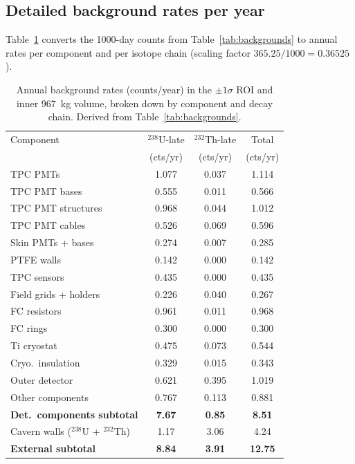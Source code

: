 \documentclass[11pt]{article}
\begin{document}
\subsection{Detailed background rates per year}

Table~\ref{tab:rates} converts the 1000-day counts from
Table~\ref{tab:backgrounds} to annual rates per component and per
isotope chain (scaling factor $365.25/1000 = 0.36525$).

\begin{table}[h]
\centering
\caption{Annual background rates (counts/year) in the $\pm 1\sigma$
  ROI and inner 967~kg volume, broken down by component and decay
  chain.  Derived from Table~\ref{tab:backgrounds}.}
\label{tab:rates}
\begin{tabular}{@{}lS[table-format=1.3]S[table-format=1.3]S[table-format=1.3]@{}}
\toprule
{Component} & {$^{238}$U-late} & {$^{232}$Th-late} & {Total} \\
 & {(cts/yr)} & {(cts/yr)} & {(cts/yr)} \\
\midrule
TPC PMTs             & 1.077 & 0.037 & 1.114 \\
TPC PMT bases        & 0.555 & 0.011 & 0.566 \\
TPC PMT structures   & 0.968 & 0.044 & 1.012 \\
TPC PMT cables       & 0.526 & 0.069 & 0.596 \\
Skin PMTs + bases    & 0.274 & 0.007 & 0.285 \\
PTFE walls           & 0.142 & 0.000 & 0.142 \\
TPC sensors          & 0.435 & 0.000 & 0.435 \\
Field grids + holders& 0.226 & 0.040 & 0.267 \\
FC resistors         & 0.961 & 0.011 & 0.968 \\
FC rings             & 0.300 & 0.000 & 0.300 \\
Ti cryostat          & 0.475 & 0.073 & 0.544 \\
Cryo.\ insulation    & 0.329 & 0.015 & 0.343 \\
Outer detector       & 0.621 & 0.395 & 1.019 \\
Other components     & 0.767 & 0.113 & 0.881 \\
\midrule
\textbf{Det.\ components subtotal} & \textbf{7.67} & \textbf{0.85} & \textbf{8.51} \\
\midrule
Cavern walls ($^{238}$U + $^{232}$Th) & 1.17 & 3.06 & 4.24 \\
\midrule
\textbf{External subtotal} & \textbf{8.84} & \textbf{3.91} & \textbf{12.75} \\

\end{tabular}
\end{table}
\end{document}
